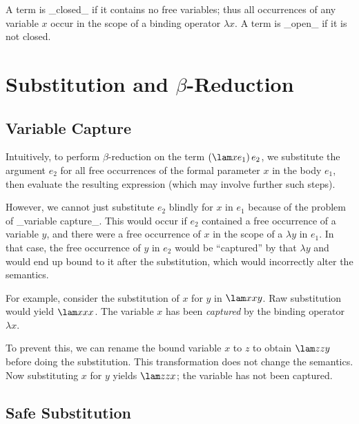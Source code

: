 A term is _closed_ if it contains no free variables; thus all occurrences of
any variable $x$ occur in the scope of a binding operator $\lambda x$.
A term is _open_ if it is not closed.

\section{Substitution and $\beta$-Reduction}

\subsection{Variable Capture}

Intuitively, to perform $\beta$-reduction on the term $(\lam x{e_1})\,e_2$, we substitute the argument $e_2$ for all free occurrences of the formal parameter $x$ in the body $e_1$, then evaluate the resulting expression (which may involve further such steps).

However, we cannot just substitute $e_2$ blindly for $x$ in $e_1$ because of the problem of _variable capture_.
This would occur if $e_2$ contained a free occurrence of a variable $y$, and there were a free occurrence of $x$
in the scope of a $\lambda y$ in $e_1$. In that case, the free occurrence of $y$ in $e_2$ would be
``captured'' by that $\lambda y$ and would end up bound to it after the substitution, which would
incorrectly alter the semantics.

For example, consider the substitution of $x$ for $y$ in $\lam x{xy}$.
Raw substitution would yield $\lam x{xx}$.
The variable $x$ has been \emph{captured} by the binding operator $\lambda x$.

To prevent this, we can rename the bound variable $x$ to $z$ to obtain
$\lam z{zy}$ before doing the substitution. This transformation does not
change the semantics. Now substituting $x$ for $y$ yields $\lam z{zx}$; the
variable has not been captured.

\subsection{Safe Substitution}


